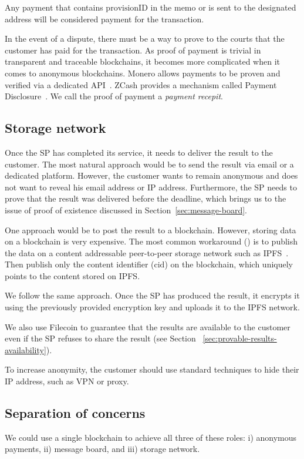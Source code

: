 \documentclass[pdftex,twocolumn,epjc3]{svjour3}
\begin{document}
{Any payment that contains $\textrm{provisionID}$ in the memo or is sent to the designated address will be considered payment for the transaction. 

In the event of a dispute, there must be a way to prove to the courts that the customer has paid for the transaction. As proof of payment is trivial in transparent and traceable blockchains, it becomes more complicated when it comes to anonymous blockchains. Monero allows payments to be proven and verified via a dedicated API~\cite{moneroHowProvePayment}. ZCash provides a mechanism called Payment Disclosure~\cite{daviesIntroductionPaymentDisclosure2017}. We call the proof of payment a \textit{payment recepit}.

\subsection{Storage network}\label{storage-network}
Once the SP has completed its service, it needs to deliver the result to the customer. The most natural approach would be to send the result via email or a dedicated platform. However, the customer wants to remain anonymous and does not want to reveal his email address or IP address. Furthermore, the SP needs to prove that the result was delivered before the deadline, which brings us to the issue of proof of existence discussed in Section~\ref{sec:message-board}.

One approach would be to post the result to a blockchain. However, storing data on a blockchain is very expensive. The most common workaround (\cite{shahidBlockchainBasedAgriFoodSupply2020, wangAuditableProtocolsFair2019, chenImprovedP2PFile2017}) is to publish the data on a content addressable peer-to-peer storage network such as IPFS~\cite{benetIPFSContentAddressed2014}. Then publish only the content identifier ($\mathrm{cid}$) on the blockchain, which uniquely points to the content stored on IPFS.

We follow the same approach. Once the SP has produced the result, it encrypts it using the previously provided encryption key and uploads it to the IPFS network.

We also use Filecoin to guarantee that the results are available to the customer even if the SP refuses to share the result (see Section ~\ref{sec:provable-results-availability}).

To increase anonymity, the customer should use standard techniques to hide their IP address, such as VPN or proxy.

\subsection{Separation of concerns}
We could use a single blockchain to achieve all three of these roles: i) anonymous payments, ii) message board, and iii) storage network.

}
\end{document}
